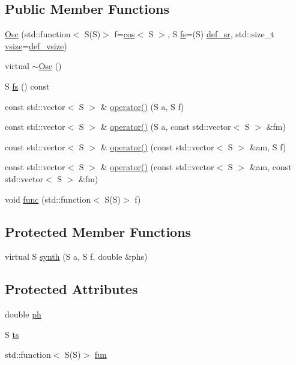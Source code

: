 \subsection*{Public Member Functions}
\begin{DoxyCompactItemize}
\item 
\hyperlink{class_aurora_1_1_osc_ac97decabac1a41e2556039548f8feab4}{Osc} (std\+::function$<$ S(S)$>$ f=\hyperlink{namespace_aurora_ab6ef1b966b8f27d107fcabe1027a677a}{cos}$<$ S $>$, S \hyperlink{class_aurora_1_1_osc_a9ac3aa9006fc98588b2163e0e56f6e30}{fs}=(S) \hyperlink{namespace_aurora_ad49263d809bea98dd422e95bc91bc03e}{def\+\_\+sr}, std\+::size\+\_\+t \hyperlink{class_aurora_1_1_snd_base_af9e21aaf411b17f7a8221c991ce5d291}{vsize}=\hyperlink{namespace_aurora_afaaddf667a06e7ce23c667a8b7295263}{def\+\_\+vsize})
\item 
virtual \hyperlink{class_aurora_1_1_osc_a95062ac1670f5de00a27c33bfb4eb117}{$\sim$\+Osc} ()
\item 
S \hyperlink{class_aurora_1_1_osc_a9ac3aa9006fc98588b2163e0e56f6e30}{fs} () const
\item 
const std\+::vector$<$ S $>$ \& \hyperlink{class_aurora_1_1_osc_a2a36c0afda86b6fabad4ed3ca0f510af}{operator()} (S a, S f)
\item 
const std\+::vector$<$ S $>$ \& \hyperlink{class_aurora_1_1_osc_af48611ef63363221de325d8976a1ec56}{operator()} (S a, const std\+::vector$<$ S $>$ \&fm)
\item 
const std\+::vector$<$ S $>$ \& \hyperlink{class_aurora_1_1_osc_a28fe97e5634b8a02474657ed456c326b}{operator()} (const std\+::vector$<$ S $>$ \&am, S f)
\item 
const std\+::vector$<$ S $>$ \& \hyperlink{class_aurora_1_1_osc_a06f9ead5fbf828f7ebb8617ac6cb24b4}{operator()} (const std\+::vector$<$ S $>$ \&am, const std\+::vector$<$ S $>$ \&fm)
\item 
void \hyperlink{class_aurora_1_1_osc_a1ffdfa0db8932dbaa7cc96e046a6d461}{func} (std\+::function$<$ S(S)$>$ f)
\end{DoxyCompactItemize}
\subsection*{Protected Member Functions}
\begin{DoxyCompactItemize}
\item 
virtual S \hyperlink{class_aurora_1_1_osc_a4e01fb1238c931c944b6b27c3790495e}{synth} (S a, S f, double \&phs)
\end{DoxyCompactItemize}
\subsection*{Protected Attributes}
\begin{DoxyCompactItemize}
\item 
double \hyperlink{class_aurora_1_1_osc_ac649d41b585b377b17eeba66a18dbcc2}{ph}
\item 
S \hyperlink{class_aurora_1_1_osc_a2c7ae380eade4eee2e6035856ed0dcbe}{ts}
\item 
std\+::function$<$ S(S)$>$ \hyperlink{class_aurora_1_1_osc_a18c443a23a6d1fc2e63ba1ee09e97bc4}{fun}
\end{DoxyCompactItemize}


